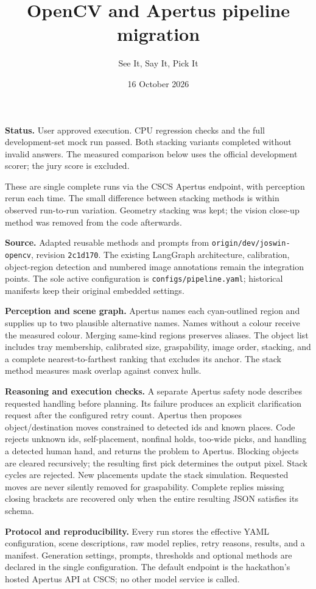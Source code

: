 \documentclass[10pt,a4paper]{article}
\title{OpenCV and Apertus pipeline migration}
\author{See It, Say It, Pick It}
\date{16 October 2026}
\begin{document}
\maketitle
\textbf{Status.} User approved execution. CPU regression checks and the full development-set
mock run passed. Both stacking variants completed without invalid answers. The measured
comparison below uses the official development scorer; the jury score is excluded.

These are single complete runs via the CSCS Apertus endpoint, with perception rerun each time.
The small difference between stacking methods is within observed run-to-run variation.
Geometry stacking was kept; the vision close-up method was removed from the code afterwards.

\textbf{Source.} Adapted reusable methods and prompts from
\texttt{origin/dev/joswin-opencv}, revision
\texttt{2c1d170}.
The existing LangGraph architecture, calibration, object-region detection and numbered image
annotations remain the integration points. The sole active configuration is
\texttt{configs/pipeline.yaml}; historical manifests keep their original embedded settings.

\textbf{Perception and scene graph.} Apertus names each cyan-outlined region and supplies up to
two plausible alternative names. Names without a colour receive the measured colour. Merging
same-kind regions preserves aliases. The object list includes tray membership, calibrated
size, graspability, image order, stacking, and a complete nearest-to-farthest ranking that
excludes its anchor. The stack method measures mask overlap against convex hulls.

\textbf{Reasoning and execution checks.} A separate Apertus safety node describes requested
handling before planning. Its failure produces an explicit clarification request after the
configured retry count. Apertus then proposes object/destination moves constrained to detected
ids and known places. Code rejects unknown ids, self-placement, nonfinal holds, too-wide picks,
and handling a detected human hand, and returns the problem to Apertus. Blocking objects are
cleared recursively; the resulting first pick determines the output pixel. Stack cycles are
rejected. New placements update the stack simulation. Requested moves are never silently
removed for graspability. Complete replies missing closing brackets are recovered only when
the entire resulting JSON satisfies its schema.

\textbf{Protocol and reproducibility.} Every run stores the effective YAML configuration,
scene descriptions, raw model replies, retry reasons, results, and a manifest. Generation
settings, prompts, thresholds and optional methods are declared in the single configuration.
The default endpoint is the hackathon's hosted Apertus API at CSCS; no other model service is
called.
\end{document}
